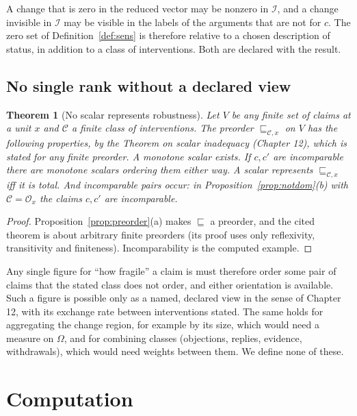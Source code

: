 \documentclass[11pt]{article}
\theoremstyle{plain}
\newtheorem{theorem}{Theorem}
\theoremstyle{definition}
\theoremstyle{remark}
\begin{document}
A change that is zero in the reduced vector may be nonzero in $\mathcal I$, and a change invisible in $\mathcal I$ may be visible in the labels of the arguments that are not for $c$. The zero set of Definition~\ref{def:sens} is therefore relative to a chosen description of status, in addition to a class of interventions. Both are declared with the result.

\subsection{No single rank without a declared view}

\begin{theorem}[No scalar represents robustness]\label{thm:noscalar}
Let $V$ be any finite set of claims at a unit $x$ and $\mathcal C$ a finite class of interventions. The preorder $\sqsubseteq_{\mathcal C,x}$ on $V$ has the following properties, by the Theorem on scalar inadequacy (Chapter 12), which is stated for any finite preorder. A monotone scalar exists. If $c,c'$ are incomparable there are monotone scalars ordering them either way. A scalar represents $\sqsubseteq_{\mathcal C,x}$ iff it is total. And incomparable pairs occur: in Proposition~\ref{prop:notdom}(b) with $\mathcal C=\mathcal O_x$ the claims $c,c'$ are incomparable.
\end{theorem}

\begin{proof}
Proposition~\ref{prop:preorder}(a) makes $\sqsubseteq$ a preorder, and the cited theorem is about arbitrary finite preorders (its proof uses only reflexivity, transitivity and finiteness). Incomparability is the computed example. \qedhere
\end{proof}

Any single figure for ``how fragile'' a claim is must therefore order some pair of claims that the stated class does not order, and either orientation is available. Such a figure is possible only as a named, declared view in the sense of Chapter 12, with its exchange rate between interventions stated. The same holds for aggregating the change region, for example by its size, which would need a measure on $\Omega$, and for combining classes (objections, replies, evidence, withdrawals), which would need weights between them. We define none of these.

\section{Computation}\label{sec:comp}
\end{document}
